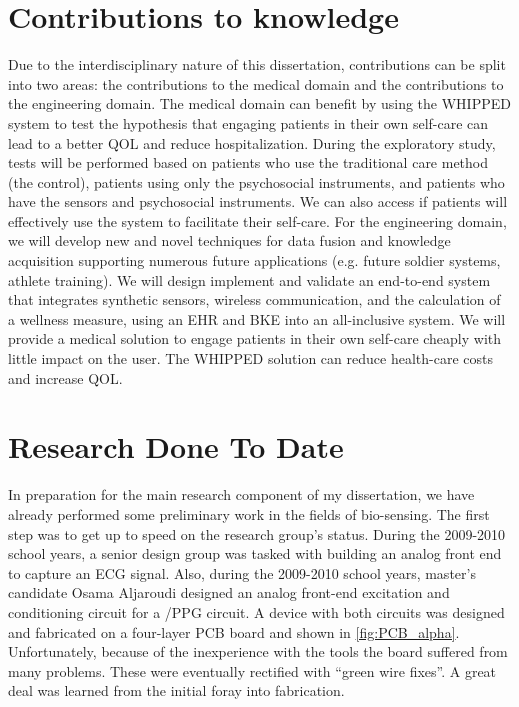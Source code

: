 \section{Contributions to knowledge}
\label{sec:ContributionsToKnowledge}
Due to the interdisciplinary nature of this dissertation, contributions can be split into two areas: the contributions to the medical domain and the contributions to the engineering domain. The medical domain can benefit by using the WHIPPED system to test the hypothesis that engaging patients in their own self-care can lead to a better QOL and reduce hospitalization. During the exploratory study, tests will be performed based on patients who use the traditional care method (the control), patients using only the psychosocial instruments, and patients who have the sensors and psychosocial instruments. We can also access if patients will effectively use the system to facilitate their self-care.
For the engineering domain, we will develop new and novel techniques for data fusion and knowledge acquisition supporting numerous future applications (e.g. future soldier systems, athlete training). We will design implement and validate an end-to-end system that integrates synthetic sensors, wireless communication, and the calculation of a wellness measure, using an EHR and BKE into an all-inclusive system. We will provide a medical solution to engage patients in their own self-care cheaply with little impact on the user. The WHIPPED solution can reduce health-care costs and increase QOL. 

\section{Research Done To Date}
\label{sec:ResearchDoneToDate}
In preparation for the main research component of my dissertation, we have already performed some preliminary work in the fields of bio-sensing. The first step was to get up to speed on the research group's status. During the 2009-2010 school years, a senior design group was tasked with building an analog front end to capture an ECG signal. Also, during the 2009-2010 school years, master's candidate Osama Aljaroudi designed an analog front-end excitation and conditioning circuit for a /PPG circuit. A device with both circuits was designed and fabricated on a four-layer PCB board and shown in \cref{fig:PCB_alpha}. Unfortunately, because of the inexperience with the tools the board suffered from many problems. These were eventually rectified with “green wire fixes”. A great deal was learned from the initial foray into fabrication.


